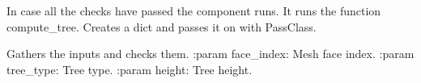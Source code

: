 \documentclass[letterpaper,10pt,english]{sphinxmanual}
\begin{document}
\begin{fulllineitems}
\begin{fulllineitems}
\end{fulllineitems}


\begin{fulllineitems}
\label{\detokenize{cmf:livestock.components.comp_cmf.CMFSyntheticTree.run}}
In case all the checks have passed the component runs.
It runs the function compute\_tree. Creates a dict and passes it on with PassClass.

\end{fulllineitems}


\begin{fulllineitems}
\label{\detokenize{cmf:livestock.components.comp_cmf.CMFSyntheticTree.run_checks}}
Gathers the inputs and checks them.
:param face\_index: Mesh face index.
:param tree\_type: Tree type.
:param height: Tree height.

\end{fulllineitems}


\end{fulllineitems}

\end{document}
